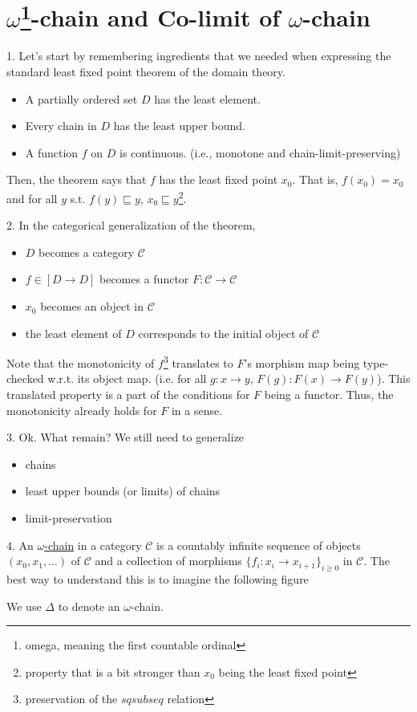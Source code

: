 \documentclass{report}[12pt]
\begin{document}
\section{$\omega$\footnote{omega, meaning the first countable ordinal}-chain and Co-limit of $\omega$-chain}
1. Let's start by  remembering ingredients that we needed when expressing the standard least fixed point theorem of the domain theory.
\begin{itemize}
  \item A partially ordered set $D$ has the least element.
  \item Every chain in $D$ has the least upper bound.
  \item A function $f$ on $D$ is continuous. (i.e., monotone and chain-limit-preserving)
\end{itemize}
Then, the theorem says that $f$ has the least fixed point $x_0$. That is, $f(x_0) = x_0$ and for all $y$ s.t. $f(y) \sqsubseteq y$, $x_0 \sqsubseteq y$\footnote{property that is a bit stronger than $x_0$ being the least fixed point}.

2. In the categorical generalization of the theorem,
\begin{itemize}
  \item $D$ becomes a category $\mathcal{C}$
  \item $f \in [D\rightarrow D]$ becomes a functor $F:\mathcal{C} \rightarrow \mathcal{C}$
  \item $x_0$ becomes an object in $\mathcal{C}$
  \item the least element of $D$ corresponds to the initial object of $\mathcal{C}$
\end{itemize}
Note that the monotonicity of $f$\footnote{preservation of the $sqsubseq$ relation} translates to $F$'s morphism map being type-checked w.r.t. its object map. (i.e. for all $g:x \rightarrow y$, $F(g):F(x)\rightarrow F(y)$). This translated property is a part of the conditions for $F$ being a functor. Thus, the monotonicity already holds for $F$ in a sense.

3. Ok. What remain? We still need to generalize
\begin{itemize}
  \item chains
  \item least upper bounds (or limits) of chains
  \item limit-preservation
\end{itemize}

4. An \underline{$\omega$-chain} in a category $\mathcal{C}$ is a countably infinite sequence of objects $(x_0, x_1, \ldots)$ of $\mathcal{C}$ and a collection of morphisms $\{f_i:x_i\rightarrow x_{i+1}\}_{i \ge 0}$ in $\mathcal{C}$. The best way to understand this is to imagine the following figure
{\center
{}\par
}
We use $\Delta$ to denote an $\omega$-chain.
\end{document}
